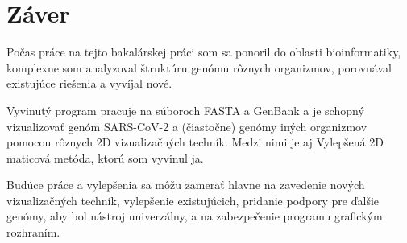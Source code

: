 
\chapter{Záver}
\label{summary}

Počas práce na tejto bakalárskej práci som sa ponoril do oblasti bioinformatiky, komplexne som analyzoval štruktúru genómu rôznych organizmov, porovnával existujúce riešenia a vyvíjal nové.

Vyvinutý program pracuje na súboroch FASTA a GenBank a je schopný vizualizovať genóm SARS-CoV-2 a (čiastočne) genómy iných organizmov pomocou rôznych 2D vizualizačných techník.
Medzi nimi je aj Vylepšená 2D maticová metóda, ktorú som vyvinul ja.

Budúce práce a vylepšenia sa môžu zamerať hlavne na zavedenie nových vizualizačných techník, vylepšenie existujúcich, pridanie podpory pre ďalšie genómy, aby bol nástroj univerzálny, a na zabezpečenie programu grafickým rozhraním.